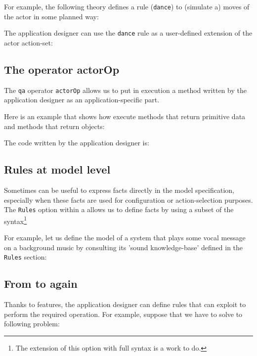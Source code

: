 For example, the following theory defines a rule (\texttt{dance}) to (simulate a) moves of the actor in some planned way:
  
 
The application designer can use the \texttt{dance} rule as a user-defined extension of the actor action-set:
  


\subsection{The operator actorOp}
The \texttt{qa} operator \texttt{actorOp} allows us to put in execution a \java{} method written by the application designer as an application-specific part. 

Here is an example that shows how execute methods that return primitive data and methods that return objects:
 

The code written by the application designer is:
 

\subsection{Rules at model level}
Sometimes can be useful to express \prolog{} facts directly in the model specification, especially when these facts are used for configuration or action-selection purposes. The \texttt{Rules} option within a \qa{} allows us to define facts by using a subset of the \prolog{} syntax\footnote{The extension of this option with full \prolog{} syntax is a work to do.}  

For example, let us define the model of a system that plays some vocal message on a background music by consulting its  'sound knowledge-base' defined in the \texttt{Rules} section:

  


\subsection{From \prolog{} to \java{} again}
Thanks to \tuprolog{} features, the application designer can define rules that can exploit \java{} to perform the required operation. For example, suppose that we have to solve to following problem:

